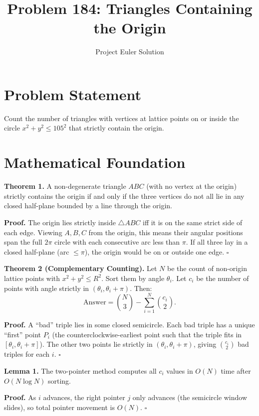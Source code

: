 \documentclass[12pt]{article}
\title{Problem 184: Triangles Containing the Origin}
\author{Project Euler Solution}
\date{}
\begin{document}
\maketitle

\section{Problem Statement}
Count the number of triangles with vertices at lattice points on or inside the circle $x^2 + y^2 \leq 105^2$ that strictly contain the origin.

\section{Mathematical Foundation}

\textbf{Theorem 1.} A non-degenerate triangle $ABC$ (with no vertex at the origin) strictly contains the origin if and only if the three vertices do not all lie in any closed half-plane bounded by a line through the origin.

\textbf{Proof.} The origin lies strictly inside $\triangle ABC$ iff it is on the same strict side of each edge. Viewing $A, B, C$ from the origin, this means their angular positions span the full $2\pi$ circle with each consecutive arc less than $\pi$. If all three lay in a closed half-plane (arc $\leq \pi$), the origin would be on or outside one edge. $\square$

\medskip

\textbf{Theorem 2 (Complementary Counting).} Let $N$ be the count of non-origin lattice points with $x^2 + y^2 \leq R^2$. Sort them by angle $\theta_i$. Let $c_i$ be the number of points with angle strictly in $(\theta_i, \theta_i + \pi)$. Then:
\[
\text{Answer} = \binom{N}{3} - \sum_{i=1}^{N} \binom{c_i}{2}.
\]

\textbf{Proof.} A ``bad'' triple lies in some closed semicircle. Each bad triple has a unique ``first'' point $P_i$ (the counterclockwise-earliest point such that the triple fits in $[\theta_i, \theta_i + \pi]$). The other two points lie strictly in $(\theta_i, \theta_i + \pi)$, giving $\binom{c_i}{2}$ bad triples for each $i$. $\square$

\medskip

\textbf{Lemma 1.} The two-pointer method computes all $c_i$ values in $O(N)$ time after $O(N \log N)$ sorting.

\textbf{Proof.} As $i$ advances, the right pointer $j$ only advances (the semicircle window slides), so total pointer movement is $O(N)$. $\square$
\end{document}
